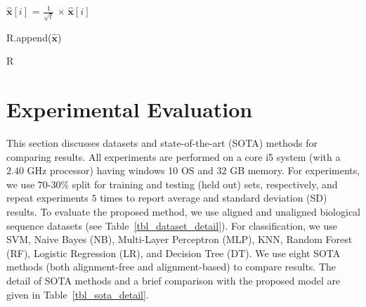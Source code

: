 \documentclass[runningheads]{llncs}
\newcommand{\vect}[1]{\mathbf{#1}}
\begin{document}
\begin{algorithm}[h!]
\begin{algorithmic}[1]
                \EndFor
                \State $\vect{\hat{x}}[i]$ = $\frac{1}{\sqrt{t}}$ $\times \; \vect{\hat{x}}[i]$ 
                
            \EndFor

            \State R.append($\vect{\hat{x}}$)
        
    \EndFor
      
    \State \Return R
    \EndFunction
    
	\end{algorithmic}
\end{algorithm}  



\section{Experimental Evaluation}\label{sec_datasetDes}
This section discusses datasets and state-of-the-art (SOTA) methods for comparing results. 
All experiments are performed on a core i5 system (with a $2.40$ GHz processor) having windows 10 OS and $32$ GB memory. 
For experiments, we use $70$-$30 \%$ split for training and testing (held out) sets, respectively, and repeat experiments $5$ times to report average and standard deviation (SD) results. 
To evaluate the proposed method, we use aligned and unaligned biological sequence datasets (see Table~\ref{tbl_dataset_detail}). 
For classification, we use SVM, Naive Bayes (NB), Multi-Layer Perceptron (MLP), KNN, Random Forest (RF), Logistic Regression (LR), and Decision Tree (DT). 
We use eight SOTA methods (both alignment-free and alignment-based) to compare results. The detail of SOTA methods and a brief comparison with the proposed model are given in Table~\ref{tbl_sota_detail}.
\end{document}
